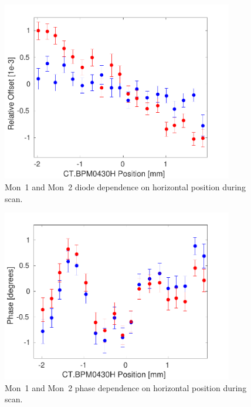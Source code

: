 \begin{figure}
  \centering
  \includegraphics[width=0.9\textwidth]{Figures/phaseMons/horizontalScanDiode}
  \caption{Mon~1 and Mon~2 diode dependence on horizontal position during scan.}
  \label{f:horizontalScanDiode}
\end{figure}

\begin{figure}
  \centering
  \includegraphics[width=0.9\textwidth]{Figures/phaseMons/horizontalPosScan}
  \caption{Mon~1 and Mon~2 phase dependence on horizontal position during scan.}
  \label{f:horizontalPosScan}
\end{figure}

